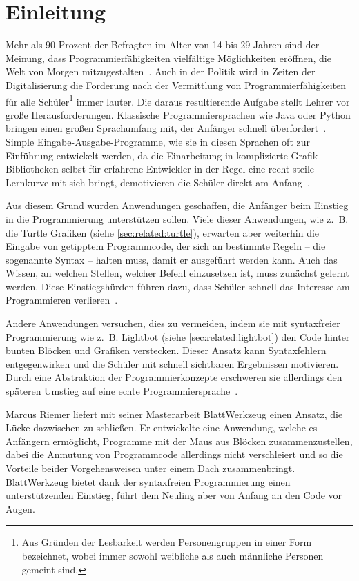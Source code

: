 \chapter{Einleitung}
\label{sec:intro}

Mehr als 90 Prozent der Befragten im Alter von 14 bis 29 Jahren sind der Meinung, dass Programmierfähigkeiten vielfältige Möglichkeiten eröffnen, die Welt von Morgen mitzugestalten~\cite{statista-1}. Auch in der Politik wird in Zeiten der Digitalisierung die Forderung nach der Vermittlung von Programmierfähigkeiten für alle Schüler\footnote{Aus Gründen der Lesbarkeit werden Personengruppen in einer Form bezeichnet, wobei immer sowohl weibliche als auch männliche Personen gemeint sind.} immer lauter. Die daraus resultierende Aufgabe stellt Lehrer vor große Herausforderungen. Klassische Programmiersprachen wie Java oder Python bringen einen großen Sprachumfang mit, der Anfänger schnell überfordert~\cite{ko2004}. Simple Eingabe-Ausgabe-Programme, wie sie in diesen Sprachen oft zur Einführung entwickelt werden, da die Einarbeitung in komplizierte Grafik-Bibliotheken selbst für erfahrene Entwickler in der Regel eine recht steile Lernkurve mit sich bringt, demotivieren die Schüler direkt am Anfang~\cite[63]{resnick2009}.

Aus diesem Grund wurden Anwendungen geschaffen, die Anfänger beim Einstieg in die Programmierung unterstützen sollen. Viele dieser Anwendungen, wie z.~B. die Turtle Grafiken (siehe \ref{sec:related:turtle}), erwarten aber weiterhin die Eingabe von getipptem Programmcode, der sich an bestimmte Regeln -- die sogenannte Syntax -- halten muss, damit er ausgeführt werden kann. Auch das Wissen, an welchen Stellen, welcher Befehl einzusetzen ist, muss zunächst gelernt werden. Diese Einstiegshürden führen dazu, dass Schüler schnell das Interesse am Programmieren verlieren~\cite{ko2004}.

Andere Anwendungen versuchen, dies zu vermeiden, indem sie mit syntaxfreier Programmierung wie z.~B. Lightbot (siehe \ref{sec:related:lightbot}) den Code hinter bunten Blöcken und Grafiken verstecken. Dieser Ansatz kann Syntaxfehlern entgegenwirken und die Schüler mit schnell sichtbaren Ergebnissen motivieren. Durch eine Abstraktion der Programmierkonzepte erschweren sie allerdings den späteren Umstieg auf eine echte Programmiersprache~\cite{gouws2013}.

Marcus Riemer liefert mit seiner Masterarbeit BlattWerkzeug einen Ansatz, die Lücke dazwischen zu schließen. Er entwickelte eine Anwendung, welche es Anfängern ermöglicht, Programme mit der Maus aus Blöcken zusammenzustellen, dabei die Anmutung von Programmcode allerdings nicht verschleiert und so die Vorteile beider Vorgehensweisen unter einem Dach zusammenbringt. BlattWerkzeug bietet dank der syntaxfreien Programmierung einen unterstützenden Einstieg, führt dem Neuling aber von Anfang an den Code vor Augen.

